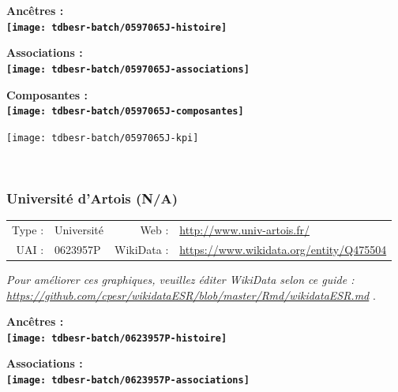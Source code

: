 \documentclass[12pt,french,]{article}
\begin{document}
\vspace{1cm}  
\begin{minipage}[b]{0.50\textwidth}\begin{center} \bf Ancêtres : \\  
\texttt{[image: tdbesr-batch/0597065J-histoire]} \end{center}\end{minipage}\begin{minipage}[b]{0.50\textwidth}\begin{center} \bf Associations : \\  
\texttt{[image: tdbesr-batch/0597065J-associations]} \end{center}\end{minipage}

\hrulefill

\begin{center} \bf Composantes : \\  
\texttt{[image: tdbesr-batch/0597065J-composantes]} \end{center}

\begin{center}\texttt{[image: tdbesr-batch/0597065J-kpi]} \end{center}\checkoddpage

\ifoddpage \fi ~\newpage  

\hypertarget{universituxe9-dartois-na}{%
\subsubsection{Université d'Artois
(N/A)}\label{universituxe9-dartois-na}}

\begin{tabular*}{\textwidth}{rp{5cm}rl}  
\hline  
Type : & Université & Web : &\href{http://www.univ-artois.fr/}{http://www.univ-artois.fr/} \\  
UAI : & 0623957P & WikiData : & \href{https://www.wikidata.org/entity/Q475504}{https://www.wikidata.org/entity/Q475504} \\  
\hline  
\end{tabular*}

\textit{\scriptsize Pour améliorer ces graphiques, veuillez éditer WikiData selon ce guide :  \href{https://github.com/cpesr/wikidataESR/blob/master/Rmd/wikidataESR.md}{https://github.com/cpesr/wikidataESR/blob/master/Rmd/wikidataESR.md}}
.

\vspace{1cm}  
\begin{minipage}[b]{0.50\textwidth}\begin{center} \bf Ancêtres : \\  
\texttt{[image: tdbesr-batch/0623957P-histoire]} \end{center}\end{minipage}\begin{minipage}[b]{0.50\textwidth}\begin{center} \bf Associations : \\  
\texttt{[image: tdbesr-batch/0623957P-associations]} \end{center}\end{minipage}
\end{document}
